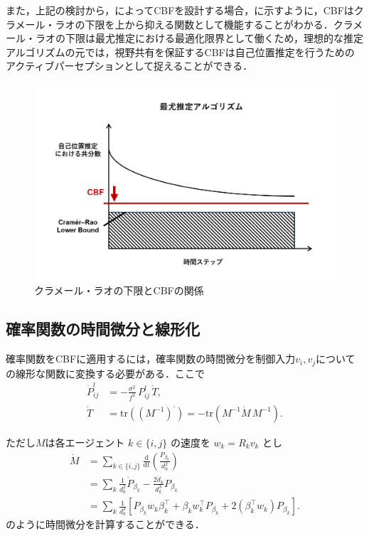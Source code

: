 また，上記の検討から，によってCBFを設計する場合，に示すように，CBFはクラメール・ラオの下限を上から抑える関数として機能することがわかる．クラメール・ラオの下限は最尤推定における最適化限界として働くため，理想的な推定アルゴリズムの元では，視野共有を保証するCBFは自己位置推定を行うためのアクティブパーセプションとして捉えることができる．
\begin{figure}[H]
    \centering
    \includegraphics[width=0.7\linewidth]{fig/CRLB.png}
    \caption{クラメール・ラオの下限とCBFの関係}
    \label{fig:CRLB}
\end{figure}

\subsection{確率関数の時間微分と線形化}

確率関数をCBFに適用するには，確率関数の時間微分を制御入力$v_i, v_j$についての線形な関数に変換する必要がある．ここで
\begin{equation}
\begin{aligned}
\dot P_{ij}^l
&= -\frac{\sigma^2}{f^2}\,P_{ij}^l\,\dot T,\\
\dot T
&= \mathrm{tr}\left((M^{-1})^{\cdot}\right)
= -\mathrm{tr}\left(M^{-1}\dot M\,M^{-1}\right).
\end{aligned}
\label{eq:chain_rule}
\end{equation}

ただし$M$は各エージェント $k\in\{i,j\}$ の速度を $w_k=R_k v_k$ とし
\begin{equation}
\begin{aligned}
\dot M
&=\sum_{k\in\{i,j\}}
\frac{\mathrm d}{\mathrm dt}\left(\tfrac{P_{\beta_k}}{d_k^2}\right)\\
&=\sum_{k}
\frac{1}{d_k^2}\dot P_{\beta_k}
-\frac{2\dot d_k}{d_k^3}P_{\beta_k}\\
&=\sum_{k}
\frac{1}{d_k^3}\left[
P_{\beta_k}w_k\beta_k^\top
+\beta_k w_k^\top P_{\beta_k}
+2(\beta_k^\top w_k)P_{\beta_k}
\right].
\end{aligned}
\label{eq:Mdot}
\end{equation}
のように時間微分を計算することができる．

